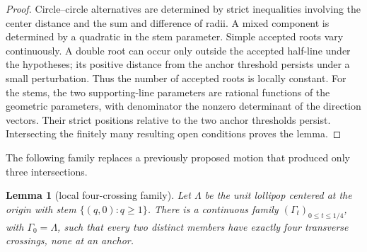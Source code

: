 \documentclass[11pt]{article}
\theoremstyle{plain}
\newtheorem{lemma}[theorem]{Lemma}
\theoremstyle{definition}
\theoremstyle{remark}
\newcommand{\1}{\mathbf 1}
\begin{document}
\begin{proof}
Circle--circle alternatives are determined by strict inequalities involving
the center distance and the sum and difference of radii.  A mixed component
is determined by a quadratic in the stem parameter.  Simple accepted roots
vary continuously.  A double root can occur only outside the accepted
half-line under the hypotheses; its positive distance from the anchor
threshold persists under a small perturbation.  Thus the number of accepted
roots is locally constant.  For the stems, the two supporting-line parameters
are rational functions of the geometric parameters, with denominator the
nonzero determinant of the direction vectors.  Their strict positions
relative to the two anchor thresholds persist.  Intersecting the finitely
many resulting open conditions proves the lemma.
\end{proof}

The following family replaces a previously proposed motion that produced
only three intersections.

\begin{lemma}[local four-crossing family]\label{lem:local4}
Let $\Lambda$ be the unit lollipop centered at the origin with stem
$\{(q,0):q\geq1\}$.  There is a continuous family
$(\Gamma_t)_{0\leq t\leq1/4}$, with $\Gamma_0=\Lambda$, such that every two
distinct members have exactly four transverse crossings, none at an anchor.
\end{lemma}
\end{document}
